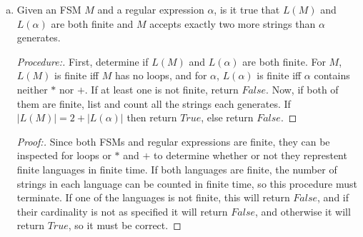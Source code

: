 \documentclass[10pt]{article}
\newcommand{\card}[1]{\left| #1 \right|}
\begin{document}
\begin{enumerate}[1)]
\begin{enumerate}[a)]
\item
Given an FSM $M$ and a regular expression $\alpha$, is it true that $L(M)$ and $L(\alpha)$ are both finite and $M$ accepts exactly two more strings than $\alpha$ generates.
\begin{proof}[Procedure:]
First, determine if $L(M)$ and $L(\alpha)$ are both finite.  For $M$, $L(M)$ is finite iff $M$ has no loops, and for $\alpha$, $L(\alpha)$ is finite iff $\alpha$ contains neither $*$ nor $+$.  If at least one is not finite, return $False$.  Now, if both of them are finite, list and count all the strings each generates.  If $\card{L(M)} = 2 + \card{L(\alpha)}$ then return $True$, else return $False$.
\end{proof}
\begin{proof}[Proof:]
Since both FSMs and regular expressions are finite, they can be inspected for loops or $*$ and $+$ to determine whether or not they represtent finite languages in finite time.  If both languages are finite, the number of strings in each language can be counted in finite time, so this procedure must terminate. If one of the languages is not finite, this will return $False$, and if their cardinality is not as specified it will return $False$, and otherwise it will return $True$, so it must be correct.
\end{proof}
\end{enumerate}
\end{enumerate}
\end{document}
